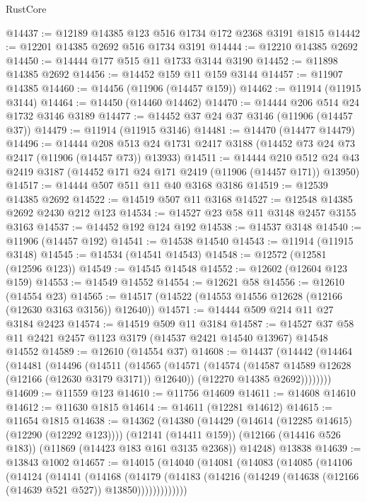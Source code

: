 \begin{lexlean}{RustCore}
\begin{coremodule}
@14437 := @12189 @14385 @123 @516 @1734 @172 @2368 @3191 @1815
@14442 := @12201 @14385 @2692 @516 @1734 @3191
@14444 := @12210 @14385 @2692
@14450 := @14444 @177 @515 @11 @1733 @3144 @3190
@14452 := @11898 @14385 @2692
@14456 := @14452 @159 @11 @159 @3144
@14457 := @11907 @14385
@14460 := @14456 (@11906 (@14457 @159))
@14462 := @11914 (@11915 @3144)
@14464 := @14450 (@14460 @14462)
@14470 := @14444 @206 @514 @24 @1732 @3146 @3189
@14477 := @14452 @37 @24 @37 @3146 (@11906 (@14457 @37))
@14479 := @11914 (@11915 @3146)
@14481 := @14470 (@14477 @14479)
@14496 := @14444
    @208
    @513
    @24
    @1731
    @2417
    @3188
    (@14452 @73 @24 @73 @2417 (@11906 (@14457 @73)) @13933)
@14511 := @14444
    @210
    @512
    @24
    @43
    @2419
    @3187
    (@14452 @171 @24 @171 @2419 (@11906 (@14457 @171)) @13950)
@14517 := @14444 @507 @511 @11 @40 @3168 @3186
@14519 := @12539 @14385 @2692
@14522 := @14519 @507 @11 @3168
@14527 := @12548 @14385 @2692 @2430 @212 @123
@14534 := @14527 @23 @58 @11 @3148 @2457 @3155 @3163
@14537 := @14452 @192 @124 @192
@14538 := @14537 @3148
@14540 := @11906 (@14457 @192)
@14541 := @14538 @14540
@14543 := @11914 (@11915 @3148)
@14545 := @14534 (@14541 @14543)
@14548 := @12572 (@12581 (@12596 @123))
@14549 := @14545 @14548
@14552 := @12602 (@12604 @123 @159)
@14553 := @14549 @14552
@14554 := @12621 @58
@14556 := @12610 (@14554 @23)
@14565 := @14517 (@14522 (@14553 @14556 @12628 (@12166 (@12630 @3163 @3156)) @12640))
@14571 := @14444 @509 @214 @11 @27 @3184 @2423
@14574 := @14519 @509 @11 @3184
@14587 := @14527 @37 @58 @11 @2421 @2457 @1123 @3179 (@14537 @2421 @14540 @13967) @14548 @14552
@14589 := @12610 (@14554 @37)
@14608 := @14437
    (@14442
      (@14464
        (@14481
          (@14496
            (@14511
              (@14565
                (@14571
                  (@14574 (@14587 @14589 @12628 (@12166 (@12630 @3179 @3171)) @12640))
                  (@12270 @14385 @2692))))))))
@14609 := @11559 @123
@14610 := @11756 @14609
@14611 := @14608 @14610
@14612 := @11630 @1815
@14614 := @14611 (@12281 @14612)
@14615 := @11654 @1815
@14638 := @14362
    (@14380
      (@14429 (@14614 (@12285 @14615) (@12290 (@12292 @123))))
      (@12141 (@14411 @159))
      (@12166 (@14416 @526 @183))
      (@11869 (@14423 @183 @161 @3135 @2368))
      @14248)
    @13838
@14639 := @13843 @1002
@14657 := @14015
    (@14040
      (@14081
        (@14083
          (@14085
            (@14106
              (@14124
                (@14141
                  (@14168
                    (@14179
                      (@14183
                        (@14216 (@14249 (@14638 (@12166 (@14639 @521 @527)) @13850)))))))))))))

\end{coremodule}
\end{lexlean}
